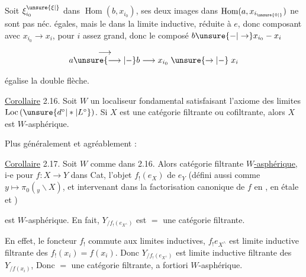 
Soit $\xi_{i_0}^{\unsure{\xi|\vphantom{\xi}}}$ dans $\operatorname{Hom}(b,x_{i_0})$, ses deux images dans $\operatorname{Hom}(a,x_{i_{\unsure{0|\vphantom{0}}}})$ ne sont pas néc. égales, mais le  dans la limite inductive, réduite à $e$, donc   composant avec $x_{i_0}\to x_i$, pour $i$ assez grand, donc le composé $b\unsure{\mathbin{-}|\to}x_{i_0}\mathbin{-}x_i$

\[
a\overset{\displaystyle\longrightarrow}{\unsure{\longrightarrow|-}}b\longrightarrow x_{i_0}\mathrel{\unsure{\to|-}}x_i
\]

 égalise la double flèche.

\uline{Corollaire} 2.16. Soit $W$ un localiseur fondamental satisfaisant l'axiome des limites $\mathrm{Loc}\,(\unsure{d^\circ|*|L^\circ})$. Si $X$  est une catégorie filtrante ou cofiltrante, alors $X$ est $W$-asphérique.

Plus généralement et agréablement :

\reversemarginpar{}\normalmarginpar

\uline{Corollaire} 2.17. Soit $W$ comme dans 2.16. Alors  catégorie filtrante \uline{ $W$-asphérique}, i-e pour   $f:X\longrightarrow Y$ dans Cat,  l'objet $f_!(e_X)$ de $e_Y$  (défini aussi comme  $y\longmapsto\pi_0({}_{y}\backslash X)$, et intervenant dans la factorisation canonique de $f$ en , en  étale et     )


est $W$-asphérique. En fait, $Y_{/f_!(e_{X^\wedge})}$ est  $=$ une catégorie filtrante.

En effet, le foncteur $f_!$ commute aux limites inductives,  $f_!e_{X^\wedge}$ est limite inductive filtrante des $f_!(x_i)=f(x_i)$. Donc $Y_{/f_!(e_{X^\wedge})}$ est limite inductive filtrante des $Y_{/f(x_i)}$, Donc   $=$ une catégorie filtrante, a fortiori  $W$-asphérique.


